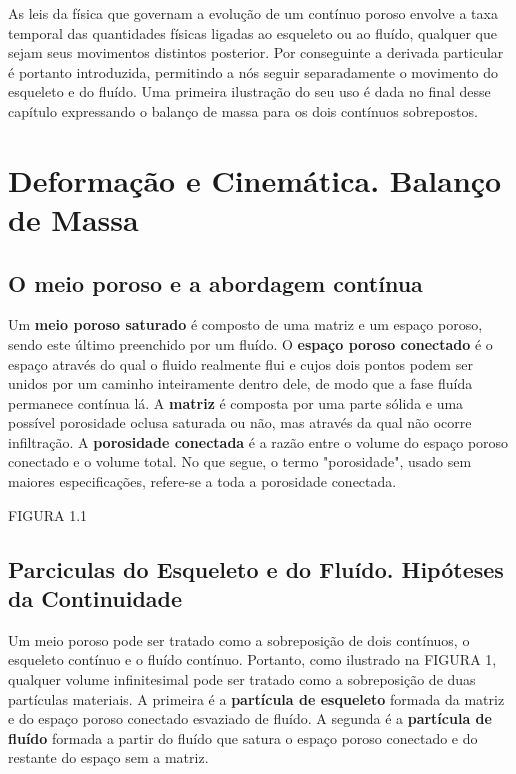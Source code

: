 \documentclass[
	11pt, %
	fleqn, %
	a4paper, %
]{LegrandOrangeBook}
\begin{document}
As leis da física que governam a evolução de um contínuo poroso envolve a taxa temporal das quantidades físicas ligadas ao esqueleto ou ao fluído, qualquer que sejam seus movimentos distintos posterior. Por conseguinte a derivada particular é portanto introduzida, permitindo a nós seguir separadamente o movimento do esqueleto e do fluído. Uma primeira ilustração do seu uso é dada no final desse capítulo expressando o balanço de massa para os dois contínuos sobrepostos.

\section{Deformação e Cinemática. Balanço de Massa}


\subsection{O meio poroso e a abordagem contínua}

Um \textbf{meio poroso saturado} é composto de uma matriz e um espaço poroso, sendo este último preenchido por um fluído. O \textbf{espaço poroso conectado} é o espaço através do qual o fluido realmente flui e cujos dois pontos podem ser unidos por um caminho inteiramente dentro dele, de modo que a fase fluída permanece contínua lá. A \textbf{matriz} é composta por uma parte sólida e uma possível porosidade oclusa saturada ou não, mas através da qual não ocorre infiltração. A \textbf{porosidade conectada} é a razão entre o volume do espaço poroso conectado e o volume total. No que segue, o termo "porosidade", usado sem maiores especificações, refere-se a toda a porosidade conectada.

FIGURA 1.1

\subsection{Parciculas do Esqueleto e do Fluído. Hipóteses da Continuidade}

Um meio poroso pode ser tratado como a sobreposição de dois contínuos, o esqueleto contínuo e o fluído contínuo. Portanto, como ilustrado na FIGURA 1, qualquer volume infinitesimal pode ser tratado como a sobreposição de duas partículas materiais. A primeira é a \textbf{partícula de esqueleto} formada da matriz e do espaço poroso conectado esvaziado de fluído. A segunda é a \textbf{partícula de fluído} formada a partir do fluído que satura o espaço poroso conectado e do restante do espaço sem a matriz.
\end{document}
